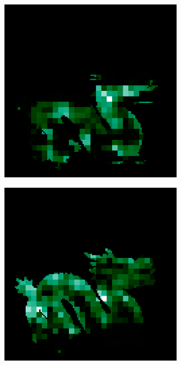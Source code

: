 \begin{figure}[H]
		\centering
		\captionsetup{width=\linewidth}
		\begin{minipage}{0.32\linewidth}
				\begin{subfigure}[t]{0.45\linewidth}
					\includegraphics[width=\linewidth]{./Figures/feature_map_gcnn/feature_map_gcnn-cnn_113.png}
				\end{subfigure}
				\begin{subfigure}[t]{0.45\linewidth}
					\includegraphics[width=\linewidth]{./Figures/feature_map_gcnn/feature_map_gcnn-cnn_102.png}
				\end{subfigure}
			

\end{minipage}
\end{figure}
